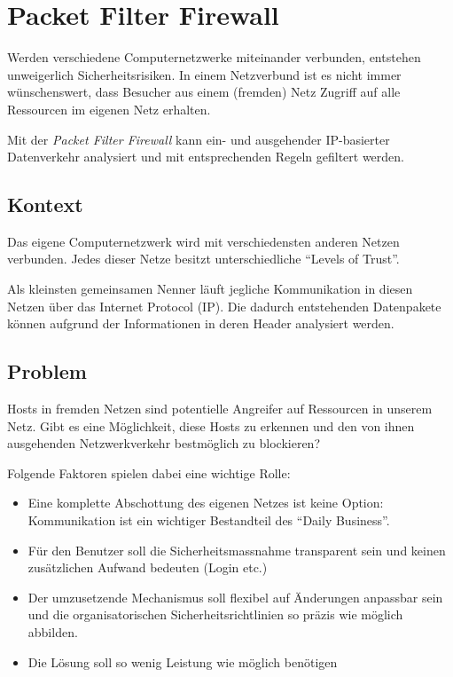 \section{Packet Filter Firewall}
\label{sec:packet-filter-firewall}

Werden verschiedene Computernetzwerke miteinander verbunden, entstehen unweigerlich Sicherheitsrisiken. In einem Netzverbund ist es nicht immer wünschenswert, dass Besucher aus einem (fremden) Netz Zugriff auf alle Ressourcen im eigenen Netz erhalten.

Mit der \emph{Packet Filter Firewall} kann ein- und ausgehender IP-basierter Datenverkehr analysiert und mit entsprechenden Regeln gefiltert werden.


\subsection*{Kontext}
Das eigene Computernetzwerk wird mit verschiedensten anderen Netzen verbunden. Jedes dieser Netze besitzt unterschiedliche ``Levels of Trust''.

Als kleinsten gemeinsamen Nenner läuft jegliche Kommunikation in diesen Netzen über das Internet Protocol (IP). Die dadurch entstehenden Datenpakete können aufgrund der Informationen in deren Header analysiert werden.

\subsection*{Problem}
Hosts in fremden Netzen sind potentielle Angreifer auf Ressourcen in unserem Netz. Gibt es eine Möglichkeit, diese Hosts zu erkennen und den von ihnen ausgehenden Netzwerkverkehr bestmöglich zu blockieren?

Folgende Faktoren spielen dabei eine wichtige Rolle:

\begin{itemize}
	\item Eine komplette Abschottung des eigenen Netzes ist keine Option: Kommunikation ist ein wichtiger Bestandteil des ``Daily Business''.
	\item Für den Benutzer soll die Sicherheitsmassnahme transparent sein und keinen zusätzlichen Aufwand bedeuten (Login etc.)
	\item Der umzusetzende Mechanismus soll flexibel auf Änderungen anpassbar sein und die organisatorischen Sicherheitsrichtlinien so präzis wie möglich abbilden.
	\item Die Lösung soll so wenig Leistung wie möglich benötigen
\end{itemize}


